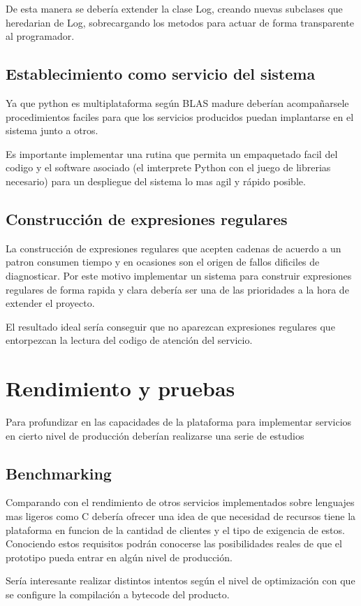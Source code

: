\documentclass[a4paper,spanish,12pt]{book}
\begin{document}
De esta manera se debería extender la clase Log, creando nuevas subclases que heredarian de Log, sobrecargando los metodos para actuar de forma transparente al programador.


\subsection{Establecimiento como servicio del sistema}
Ya que python es multiplataforma según BLAS madure deberían acompañarsele procedimientos faciles para que los servicios producidos puedan implantarse en el sistema junto a otros.

Es importante implementar una rutina que permita un empaquetado facil del codigo y el software asociado (el imterprete Python con el juego de librerias necesario) para un despliegue del sistema lo mas agil y rápido posible.

\subsection{Construcción de expresiones regulares}
La construcción de expresiones regulares que acepten cadenas de acuerdo a un patron consumen tiempo y en ocasiones son el origen de fallos dificiles de diagnosticar. Por este motivo implementar un sistema para construir expresiones regulares de forma rapida y clara debería ser una de las prioridades a la hora de extender el proyecto.

El resultado ideal sería conseguir que no aparezcan expresiones regulares que entorpezcan la lectura del codigo de atención del servicio.
\section{Rendimiento y pruebas}
Para profundizar en las capacidades de la plataforma para implementar servicios en cierto nivel de producción deberían realizarse una serie de estudios
\subsection{Benchmarking}
Comparando con el rendimiento de otros servicios implementados sobre lenguajes mas ligeros como C debería ofrecer una idea de que necesidad de recursos tiene la plataforma en funcion de la cantidad de clientes y el tipo de exigencia de estos. Conociendo estos requisitos podrán conocerse las posibilidades reales de que el prototipo pueda entrar en algún nivel de producción.

Sería interesante realizar distintos intentos según el nivel de optimización con que se configure la compilación a bytecode del producto.
\end{document}
